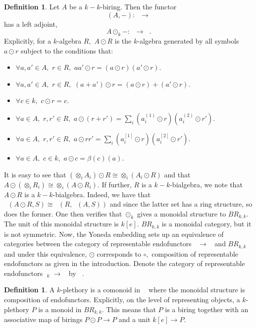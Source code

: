 \documentclass[a4paper, 12pt]{amsart}
\DeclareMathOperator{\Ringk}{Ring_k}
\DeclareMathOperator{\Alg}{Alg_k}
\DeclareMathOperator{\Algk}{Alg_k}
\DeclareMathOperator{\Algkend}{Alg_k^{end}}
\numberwithin{equation}{section}
\theoremstyle{definition}
\newtheorem{definition}[theorem]{Definition}
\begin{document}
\begin{definition}
Let $A$ be a $k-k$-biring. Then the functor $$\Ringk(A,-):\Alg \rightarrow
\Alg$$ has a left adjoint, $$A \odot_k -:\Alg \rightarrow \Alg.$$
Explicitly, for a $k$-algebra $R,$ $A \odot R$ is the $k$-algebra
generated by all symbols $a \odot r$ subject to the conditions that: \\
\begin{itemize}

\item $\forall a,a' \in A,$ $r \in R,$ $aa' \odot r = (a \odot r )(a'
\odot r).$

\item $\forall a,a' \in A,$ $r \in R,$ $(a+a') \odot r = (a \odot r) +
(a' \odot r).$

\item $\forall c \in k,$ $c \odot r = c.$

\item $\forall a \in A,$ $r,r' \in R,$ $a \odot (r+r') = \sum_i
(a_i^{(1)} \odot r)(a_i^{(2)} \odot r').$

\item $\forall a \in A,$ $r,r' \in R,$ $a \odot rr' = \sum_i (a_i^{[1]}
\odot r)(a_i^{[2]} \odot r').$

\item $\forall a \in A,$ $c \in k,$ $a \odot c = \beta(c)(a).$

\end{itemize}

\end{definition}

\noindent It is easy to see that $(\otimes_i A_i) \odot R \cong \otimes_i (A_i
\odot R)$ and that $A \odot (\otimes_i R_i ) \cong \otimes_i (A \odot
R_i).$ If further, $R$ is a $k-k$-bialgebra, we note that $A \odot R$ is
a $k-k$-bialgebra. Indeed, we have that $\Ringk(A \odot R,S) \cong
\Ringk(R,\Ringk(A,S))$ and since the latter set has a ring structure, so
does the former. One then verifies that $\odot_k$ gives a monoidal
structure to $BR_{k,k}.$ The unit of this monoidal structure is $k[e].$
$BR_{k,k}$ is a monoidal category, but it is not symmetric. Now, the Yoneda embedding sets up an equivalence of categories between the category of representable endofunctors $\Algk \rightarrow 
\Algk$ and $BR_{k,k}$ and under this equivalence, $\odot$ corresponds to $\circ,$ composition of representable endofunctors as given in the introduction. Denote the category of representable endofunctors $\Alg_k \rightarrow \Algk$ by $\Algkend.$
\begin{definition}
A $k$-plethory is a comonoid in $\Algkend$ where the monoidal structure is composition of endofunctors. Explicitly, on the level of representing objects, a $k$-plethory $P$ is a monoid in $BR_{k,k}.$ This means that $P$ is a
biring together with an associative map of birings $P \odot P
\rightarrow P$ and a unit $k[e] \rightarrow P.$

\end{definition}
\end{document}
